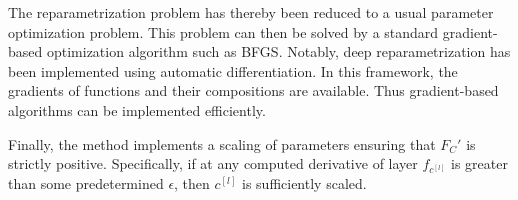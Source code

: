 The reparametrization problem has thereby been reduced to a usual parameter optimization problem. This problem can then be solved by a standard gradient-based optimization algorithm such as BFGS. Notably, deep reparametrization has been implemented using automatic differentiation. In this framework, the gradients of functions and their compositions are available. Thus gradient-based algorithms can be implemented efficiently.

Finally, the method implements a scaling of parameters ensuring that \(F_C' \) is strictly positive. Specifically, if at any computed derivative of layer  \(f_{c^{[l]}}\) is greater than some predetermined \(\epsilon\), then \(c^{[l]}\) is sufficiently scaled. 